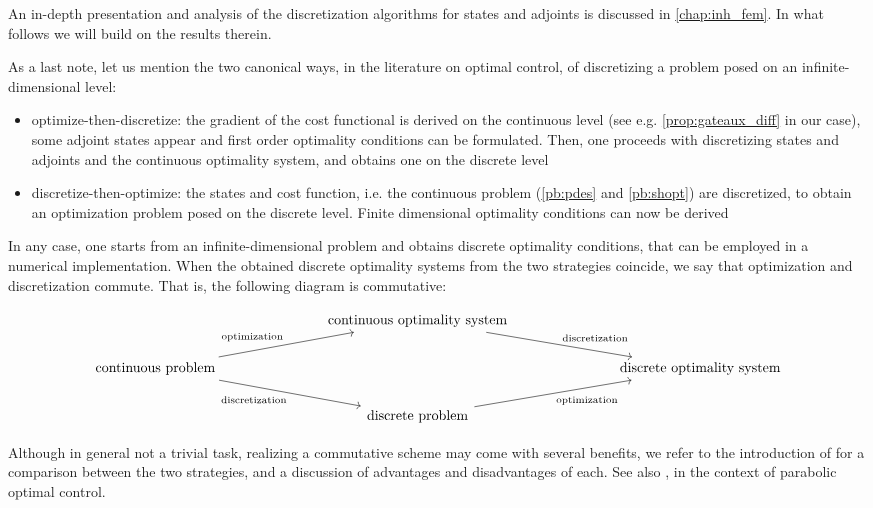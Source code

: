 \documentclass[english,a4paper,9pt,oneside]{scrbook}	%
\theoremstyle{break}
\theoremstyle{remark}
\begin{document}
An in-depth presentation and analysis of the discretization algorithms for states and adjoints is discussed in \cref{chap:inh_fem}. In what follows we will build on the results therein.

As a last note, let us mention the two canonical ways, in the literature on optimal control, of discretizing a problem posed on an infinite-dimensional level:

\begin{itemize}
	\item optimize-then-discretize: the gradient of the cost functional is derived on the continuous level (see e.g. \cref{prop:gateaux_diff} in our case), some adjoint states appear and first order optimality conditions can be formulated. Then, one proceeds with discretizing states and adjoints and the continuous optimality system, and obtains one on the discrete level
	\item discretize-then-optimize: the states and cost function, i.e. the continuous problem (\cref{pb:pdes} and \cref{pb:shopt}) are discretized, to obtain an optimization problem posed on the discrete level. Finite dimensional optimality conditions can now be derived
\end{itemize}

In any case, one starts from an infinite-dimensional problem and obtains discrete optimality conditions, that can be employed in a numerical implementation. When the obtained discrete optimality systems from the two strategies coincide, we say that optimization and discretization commute. That is, the following diagram is commutative:

\[\begin{tikzcd}
	&&& \text{continuous optimality system} \\
	\text{continuous problem} &&&&&& \text{discrete optimality system}  \\
	&&& \text{discrete problem} 
	\arrow["{\text{optimization}}"', from=3-4, to=2-7]
	\arrow["{\text{discretization}}", from=1-4, to=2-7]
	\arrow["{\text{optimization}}", from=2-1, to=1-4]
	\arrow["{\text{discretization}}"', from=2-1, to=3-4]
\end{tikzcd}\]

Although in general not a trivial task, realizing a commutative scheme may come with several benefits, we refer to the introduction of \cite{liu} for a comparison between the two strategies, and a discussion of advantages and disadvantages of each. See also \cite{flaig}, in the context of parabolic optimal control.
\end{document}
